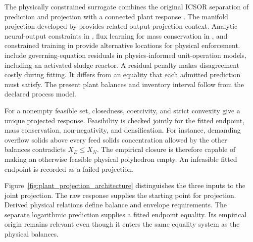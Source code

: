 The physically constrained surrogate combines the original ICSOR separation of prediction and projection with a connected plant response \citep{Selerio2026}. The manifold projection developed by \citet{Valente2025} provides related output-projection context. Analytic neural-output constraints in \citet{Beucler2021}, flux learning for mass conservation in \citet{SturmWexler2020}, and constrained training in \citet{Ruckstuhl2021} provide alternative locations for physical enforcement. \citet{Li2024} include governing-equation residuals in physics-informed unit-operation models, including an activated sludge reactor. A residual penalty makes disagreement costly during fitting. It differs from an equality that each admitted prediction must satisfy. The present plant balances and inventory interval follow from the declared process model.

For a nonempty feasible set, closedness, coercivity, and strict convexity give a unique projected response. Feasibility is checked jointly for the fitted endpoint, mass conservation, non-negativity, and densification. For instance, demanding overflow solids above every feed solids concentration allowed by the other balances contradicts $X_E\le X_N$. The empirical closure is therefore capable of making an otherwise feasible physical polyhedron empty. An infeasible fitted endpoint is recorded as a failed projection.

Figure~\ref{fig:plant_projection_architecture} distinguishes the three inputs to the joint projection. The raw response supplies the starting point for projection. Derived physical relations define balance and envelope requirements. The separate logarithmic prediction supplies a fitted endpoint equality. Its empirical origin remains relevant even though it enters the same equality system as the physical balances.

